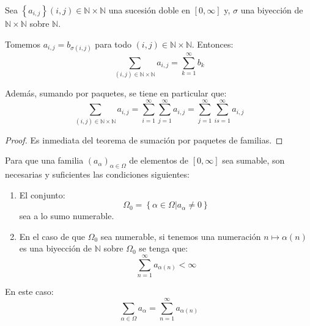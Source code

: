 \documentclass[12pt]{report}
\theoremstyle{largebreak}
\begin{document}
    \begin{cor}
        Sea $\left\{a_{i,j} \right\}{(i,j)\in\mathbb{N}\times\mathbb{N}}$ una sucesión doble en $[0,\infty]$ y, $\sigma$ una biyección de $\mathbb{N}\times\mathbb{N}$ sobre $\mathbb{N}$.

        Tomemos $a_{i,j }=b_{\sigma(i,j)}$ para todo $(i,j)\in\mathbb{N}\times\mathbb{N}$. Entonces:
        \begin{equation*}
            \sum_{(i,j)\in\mathbb{N}\times\mathbb{N}}a_{i,j }=\sum_{k=1 }^{\infty}b_k
        \end{equation*}

        Además, sumando por paquetes, se tiene en particular que:
        \begin{equation*}
            \sum_{(i,j)\in\mathbb{N}\times\mathbb{N}}a_{i,j }=\sum_{i=1 }^{\infty} \sum_{j=1 }^{\infty}a_{ i,j}=\sum_{j=1 }^{\infty} \sum_{is=1 }^{\infty}a_{ i,j}
        \end{equation*}
    \end{cor}

    \begin{proof}
        Es inmediata del teorema de sumación por paquetes de familias.
    \end{proof}

    \begin{theor}
        Para que una familia $\left(a_\alpha \right)_{\alpha\in\Omega }$ de elementos de $[0,\infty]$ sea sumable, son necesarias y suficientes las condiciones siguientes:
        \begin{enumerate}
            \item El conjunto:
            \begin{equation*}
                \Omega_0=\left\{\alpha\in\Omega\Big|a_\alpha\neq0 \right\}
            \end{equation*}
            sea a lo sumo numerable.
            \item En el caso de que $\Omega_0$ sea numerable, si tenemos una numeración $n\mapsto\alpha(n)$ es una biyección de $\mathbb{N}$ sobre $\Omega_0$ se tenga que:
            \begin{equation*}
                \sum_{n=1 }^{\infty}a_{\alpha(n)}<\infty
            \end{equation*}
        \end{enumerate}
        En este caso:
        \begin{equation*}
            \sum_{\alpha\in\Omega }a_\alpha=\sum_{n=1 }^{\infty}a_{\alpha(n)}
        \end{equation*}

    \end{theor}
    
\end{document}
